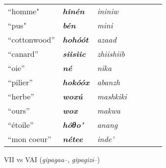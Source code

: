 \documentclass[twoside,a4paper,11pt]{article}
\newcommand{\ipa}[1]{{\phon\textbf{\textit{#1}}}}
\newcommand{\Σ}{\greek{Σ}}
\begin{document}
\begin{table}[h]
\begin{tabular}{lllllll}
``homme" & \ipa{hinén} & \textit{ininiw} \\
``pus" & \ipa{bén} & \textit{mini} \\
``cottonwood'' &\ipa{hohóót} &\textit{azaad} \\
``canard'' &\ipa{siisiic} &\textit{zhiishiib} \\
``oie'' &\ipa{né} &\textit{nika} \\
``pilier'' &\ipa{hokóóx} &\textit{abanzh} \\
``herbe'' &\ipa{woxú} &\textit{mashkiki} \\
``ours'' &\ipa{wox} &\textit{makwa} \\
``étoile'' &\ipa{hóθo'} &\textit{anang} \\
``mon coeur'' &\ipa{nétee} &\textit{inde'} \\
\bottomrule
\end{tabular}
\end{table}
VII vs VAI (\textit{gipagaa}--, \textit{gipagizi}--)

 
 
\end{document}
